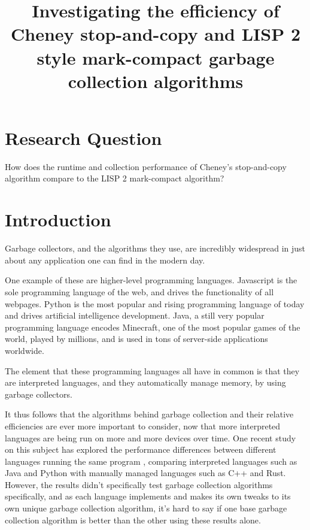 \documentclass[index]{subfiles}
\begin{document}
\title{Investigating the efficiency of Cheney stop-and-copy and LISP 2 style mark-compact garbage collection algorithms}
\date{}
\author{}
\maketitle

\section{Research Question}

How does the runtime and collection performance of Cheney's stop-and-copy algorithm compare to the LISP 2 mark-compact algorithm?

\section{Introduction}

Garbage collectors, and the algorithms they use, are incredibly widespread in just about any application one can find in the modern day.

One example of these are higher-level programming languages. Javascript is the sole programming language of the web, and drives the functionality of all webpages. Python is the most popular and rising programming language of today and drives artificial intelligence development. Java, a still very popular programming language encodes Minecraft, one of the most popular games of the world, played by millions, and is used in tons of server-side applications worldwide.

The element that these programming languages all have in common is that they are interpreted languages, and they automatically manage memory, by using garbage collectors.

It thus follows that the algorithms behind garbage collection and their relative efficiencies are ever more important to consider, now that more interpreted languages are being run on more and more devices over time. One recent study on this subject has explored the performance differences between different languages running the same program \cite{programming_languages_electricity}, comparing interpreted languages such as Java and Python with manually managed languages such as C++ and Rust. However, the results didn't specifically test garbage collection algorithms specifically, and as each language implements and makes its own tweaks to its own unique garbage collection algorithm, it's hard to say if one base garbage collection algorithm is better than the other using these results alone.
\end{document}
